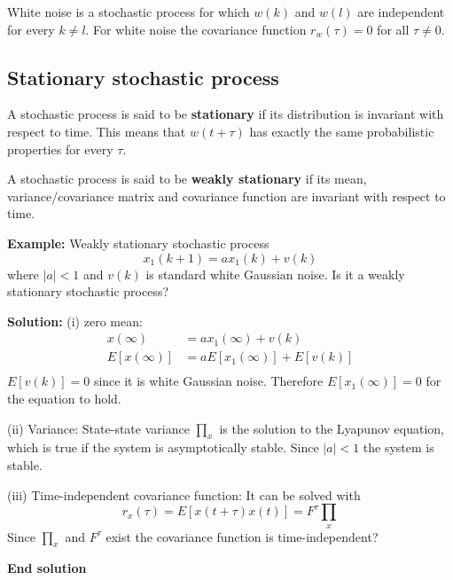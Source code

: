 \begin{multicols}{2}
White noise is a stochastic process for which $w(k)$ and $w(l)$ are independent
for every $k\neq l$. For white noise the covariance function $r_w(\tau)=0$ for all $\tau\neq0$.

\subsection{Stationary stochastic process}
A stochastic process is said to be \textbf{stationary} if its distribution is
invariant with respect to time.
This means that $w(t+\tau)$ has exactly the same probabilistic
properties for every $\tau$.

A stochastic process is said to be \textbf{weakly stationary} if its mean,
variance/covariance matrix and covariance function are invariant
with respect to time.



\textbf{Example:}
Weakly stationary stochastic process
\begin{equation*}
    x_1(k+1) = ax_1(k) + v(k)
\end{equation*}
where $|a|<1$ and $v(k)$ is standard white Gaussian noise. 
Is it a weakly stationary stochastic process?

\textbf{Solution:}\newline
(i) zero mean:
\begin{align*}
    x(\infty) &= ax_1(\infty) + v(k) \\
    E[x(\infty)] &= aE[x_1(\infty)] + E[v(k)] \\
\end{align*}
$E[v(k)] = 0$ since it is white Gaussian noise. Therefore $E[x_1(\infty)] = 0$ 
for the equation to hold.

(ii) Variance:
State-state variance $\prod_x$ is the solution to the Lyapunov equation,
which is true if the system is asymptotically stable.
Since $|a|<1$ the system is stable.

(iii) Time-independent covariance function:
It can be solved with
\begin{equation*}
    r_x(\tau) = E[x(t+\tau)x(t)] = F^{\tau}\prod_x
\end{equation*}
Since $\prod_x$ and $F^{\tau}$ exist the covariance function is time-independent?

\textbf{End solution}


\end{multicols}
